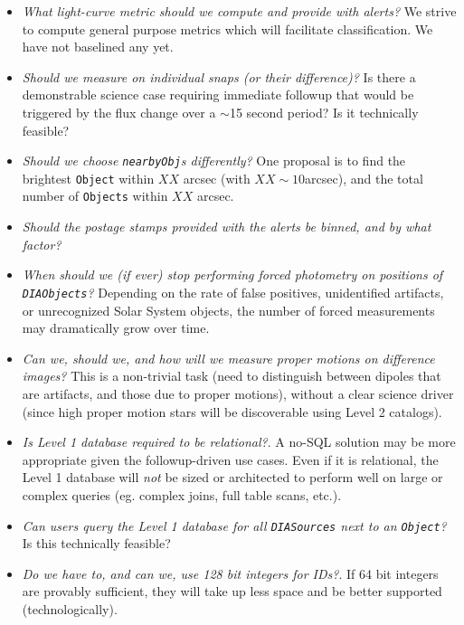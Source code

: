 \documentclass[12pt]{article}
\newcommand{\code}[1]{\texttt{#1}}
\newcommand{\DIASources}{\code{DIASources}\xspace}
\newcommand{\DIAObjects}{\code{DIAObjects}\xspace}
\newcommand{\DB}{{Level 1 database}\xspace}
\newcommand{\Object}{\code{Object}\xspace}
\newcommand{\Objects}{\code{Objects}\xspace}
\begin{document}
\begin{itemize}
\item {\em What light-curve metric should we compute and provide with alerts?}
      We strive to compute general purpose metrics which will facilitate
      classification. We have not baselined any yet.
\item {\em Should we measure on individual snaps (or their difference)?} Is
      there a demonstrable science case requiring immediate followup that
      would be triggered by the flux change over a $\sim$15 second period? Is
      it technically feasible?
\item {\em Should we choose {\tt nearbyObj}s differently?} One proposal is to
      find the brightest \Object within $XX$ arcsec (with $XX \sim 10$arcsec),
      and the total number of \Objects within $XX$ arcsec.
\item {\em Should the postage stamps provided with the alerts be binned, and
      by what factor?}
\item {\em When should we (if ever) stop performing forced photometry on
      positions of \DIAObjects?} Depending on the rate of false positives,
      unidentified artifacts, or unrecognized Solar System objects, the number
      of forced measurements may dramatically grow over time.
\item {\em Can we, should we, and how will we measure proper motions on
      difference images?} This is a non-trivial task (need to distinguish
      between dipoles that are artifacts, and those due to proper motions),
      without a clear science driver (since high proper motion stars will be
      discoverable using Level 2 catalogs).
\item {\em Is \DB required to be relational?}. A no-SQL solution may be more
      appropriate given the followup-driven use cases. Even if it is
      relational, the Level 1 database will {\em not} be sized or architected
      to perform well on large or complex queries (eg. complex joins, full
      table scans, etc.).
\item {\em Can users query the \DB for all \DIASources next to an \Object?} Is
      this technically feasible?
\item {\em Do we have to, and can we, use 128 bit integers for IDs?}. If 64
      bit integers are provably sufficient, they will take up less space and
      be better supported (technologically).
\end{itemize}
\end{document}
